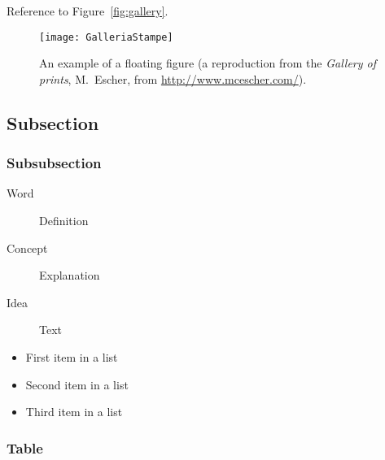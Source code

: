 \documentclass[
    10pt, %
    a4paper, %
    oneside, %
    headinclude,footinclude, %
    BCOR5mm, %
]{scrartcl}
\begin{document}
    Reference to Figure~\vref{fig:gallery}. %

    \begin{figure}[tb]
        \centering
        \texttt{[image: GalleriaStampe]}
        \caption[An example of a floating figure]{An example of a floating figure (a reproduction from the \emph{Gallery of prints}, M.~Escher, from \url{http://www.mcescher.com/}).} %
        \label{fig:gallery}
    \end{figure}

    \lipsum[10] %


    \subsection{Subsection}

    \lipsum[11] %

    \subsubsection{Subsubsection}

    \lipsum[12] %

    \begin{description}
        \item[Word] Definition
        \item[Concept] Explanation
        \item[Idea] Text
    \end{description}

    \lipsum[12] %

    \begin{itemize}[noitemsep] %
        \item First item in a list
        \item Second item in a list
        \item Third item in a list
    \end{itemize}

    \subsubsection{Table}
\end{document}
